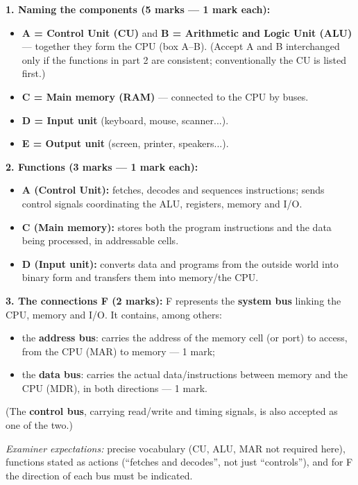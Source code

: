 \documentclass[11pt]{article}
\begin{document}
\begin{corrige}
\textbf{1. Naming the components (5 marks — 1 mark each):}
\begin{itemize}
\item \textbf{A = Control Unit (CU)} and \textbf{B = Arithmetic and Logic Unit (ALU)} — together they form the CPU (box A--B). (Accept A and B interchanged only if the functions in part 2 are consistent; conventionally the CU is listed first.)
\item \textbf{C = Main memory (RAM)} — connected to the CPU by buses.
\item \textbf{D = Input unit} (keyboard, mouse, scanner...).
\item \textbf{E = Output unit} (screen, printer, speakers...).
\end{itemize}

\textbf{2. Functions (3 marks — 1 mark each):}
\begin{itemize}
\item \textbf{A (Control Unit):} fetches, decodes and sequences instructions; sends control signals coordinating the ALU, registers, memory and I/O.
\item \textbf{C (Main memory):} stores both the program instructions and the data being processed, in addressable cells.
\item \textbf{D (Input unit):} converts data and programs from the outside world into binary form and transfers them into memory/the CPU.
\end{itemize}

\textbf{3. The connections F (2 marks):}
F represents the \textbf{system bus} linking the CPU, memory and I/O. It contains, among others:
\begin{itemize}
\item the \textbf{address bus}: carries the address of the memory cell (or port) to access, from the CPU (MAR) to memory — 1 mark;
\item the \textbf{data bus}: carries the actual data/instructions between memory and the CPU (MDR), in both directions — 1 mark.
\end{itemize}
(The \textbf{control bus}, carrying read/write and timing signals, is also accepted as one of the two.)

\emph{Examiner expectations:} precise vocabulary (CU, ALU, MAR not required here), functions stated as actions (``fetches and decodes'', not just ``controls''), and for F the direction of each bus must be indicated.
\end{corrige}
\end{document}
